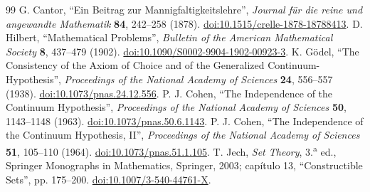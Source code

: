 \begin{thebibliography}{99}
 G. Cantor, ``Ein Beitrag zur Mannigfaltigkeitslehre'',
\emph{Journal für die reine und angewandte Mathematik} \textbf{84},
242--258 (1878). \href{https://doi.org/10.1515/crelle-1878-18788413}{doi:10.1515/crelle-1878-18788413}.
 D. Hilbert, ``Mathematical Problems'',
\emph{Bulletin of the American Mathematical Society} \textbf{8},
437--479 (1902). \href{https://doi.org/10.1090/S0002-9904-1902-00923-3}{doi:10.1090/S0002-9904-1902-00923-3}.
 K. Gödel, ``The Consistency of the Axiom of Choice and
of the Generalized Continuum-Hypothesis'', \emph{Proceedings of the National
Academy of Sciences} \textbf{24}, 556--557 (1938).
\href{https://doi.org/10.1073/pnas.24.12.556}{doi:10.1073/pnas.24.12.556}.
 P. J. Cohen, ``The Independence of the Continuum
Hypothesis'', \emph{Proceedings of the National Academy of Sciences}
\textbf{50}, 1143--1148 (1963).
\href{https://doi.org/10.1073/pnas.50.6.1143}{doi:10.1073/pnas.50.6.1143}.
 P. J. Cohen, ``The Independence of the Continuum
Hypothesis, II'', \emph{Proceedings of the National Academy of Sciences}
\textbf{51}, 105--110 (1964).
\href{https://doi.org/10.1073/pnas.51.1.105}{doi:10.1073/pnas.51.1.105}.
\enlargethispage{3\baselineskip}
 T. Jech, \emph{Set Theory}, 3.\textsuperscript{a} ed.,
Springer Monographs in Mathematics, Springer, 2003; capítulo 13,
``Constructible Sets'', pp. 175--200.
\href{https://doi.org/10.1007/3-540-44761-X}{doi:10.1007/3-540-44761-X}.
\end{thebibliography}
